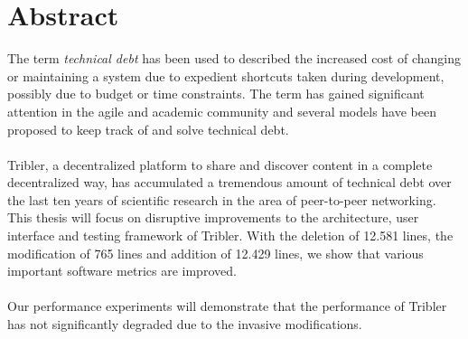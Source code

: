 \chapter*{Abstract}
The term \emph{technical debt} has been used to described the increased cost of changing or maintaining a system due to expedient shortcuts taken during development, possibly due to budget or time constraints. The term has gained significant attention in the agile and academic community and several models have been proposed to keep track of and solve technical debt.\\\\
Tribler, a decentralized platform to share and discover content in a complete decentralized way, has accumulated a tremendous amount of technical debt over the last ten years of scientific research in the area of peer-to-peer networking. This thesis will focus on disruptive improvements to the architecture, user interface and testing framework of Tribler. With the deletion of 12.581 lines, the modification of 765 lines and addition of 12.429 lines, we show that various important software metrics are improved.\\\\
Our performance experiments will demonstrate that the performance of Tribler has not significantly degraded due to the invasive modifications.